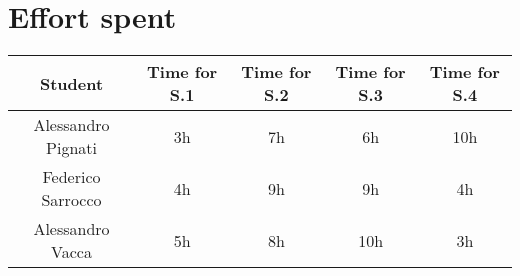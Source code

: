 \section{Effort spent}
\begin{tabular}{ | c || c | c | c | c|}
    \hline
    Student             & Time for S.1 & Time for S.2 & Time for S.3 & Time for S.4 \\ \hline
    Alessandro Pignati  & 3h           & 7h  & 6h          & 10h           \\ \hline
    Federico Sarrocco   & 4h           & 9h  & 9h          & 4h           \\ \hline
    Alessandro Vacca    & 5h           & 8h  & 10h          & 3h           \\
    \hline
\end{tabular}